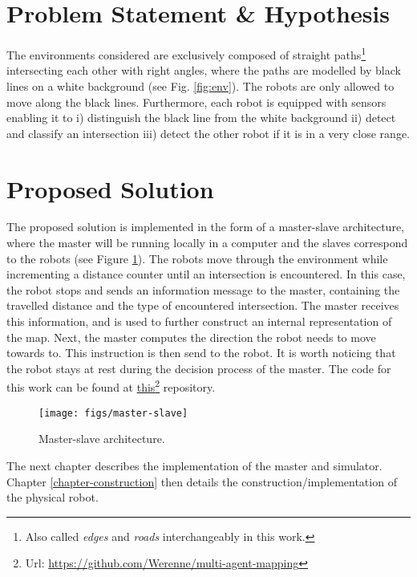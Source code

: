 \documentclass[12pt]{report}
\begin{document}
\section{Problem Statement \& Hypothesis}
The environments considered are exclusively composed of straight paths\footnote{Also called \textit{edges} and \textit{roads} interchangeably in this work.} intersecting each other with right angles, where the paths are modelled by black lines on a white background (see Fig. \ref{fig:env}). The robots are only allowed to move along the black lines. Furthermore, each robot is equipped with sensors enabling it to i) distinguish the black line from the white background ii) detect and classify an intersection iii) detect the other robot if it is in a very close range.

\section{Proposed Solution}
The proposed solution is implemented in the form of a master-slave architecture, where the master will be running locally in a computer and the slaves correspond to the robots (see Figure \ref{fig:master-slave}). The robots move through the environment while incrementing a distance counter until an intersection is encountered. In this case, the robot stops and sends an information message to the master, containing the travelled distance and the type of encountered intersection. The master receives this information, and is used to further construct an internal representation of the map. Next, the master computes the direction the robot needs to move towards to. This instruction is then send to the robot. It is worth noticing that the robot stays at rest during the decision process of the master. The code for this work can be found at \href{https://github.com/Werenne/multi-agent-mapping}{this}\footnote{Url: \url{https://github.com/Werenne/multi-agent-mapping}} repository.

\begin{figure}[!h]
\centering
\texttt{[image: figs/master-slave]}
\caption{Master-slave architecture.}
\label{fig:master-slave}
\end{figure}

The next chapter describes the implementation of the master and simulator. Chapter \ref{chapter-construction} then details the construction/implementation of the physical robot. 
\end{document}
